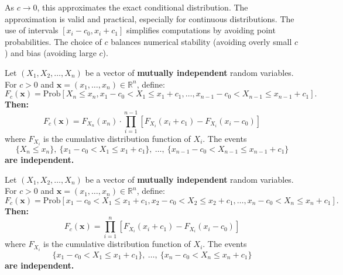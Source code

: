 As \(c \to 0\), this approximates the exact conditional distribution. The approximation is valid and practical, especially for continuous distributions. The use of intervals \([x_i - c_0, x_i + c_1]\) simplifies computations by avoiding point probabilities. The choice of \(c\) balances numerical stability (avoiding overly small \(c\)) and bias (avoiding large \(c\)).

\begin{theorem}
Let $(X_1, X_2, \dots, X_n)$ be a vector of \textbf{mutually independent} random variables. For $c > 0$ and $\mathbf{x} = (x_1, \dots, x_n) \in \mathbb{R}^n$, define:
\[
F_c(\mathbf{x}) = \mathrm{Prob}\left[ X_n \leq x_n,  x_1 - c_0 < X_1 \leq x_1 + c_1,  \dots,  x_{n-1} - c_0 < X_{n-1} \leq x_{n-1} + c_1 \right].
\]
\textbf{Then:}
\begin{equation}\label{eee91a}
\boxed{F_c(\mathbf{x}) = F_{X_n}(x_n) \cdot \prod_{i=1}^{n-1} \left[ F_{X_i}(x_i + c_1) - F_{X_i}(x_i - c_0) \right]}
\end{equation}
where $F_{X_i}$ is the cumulative distribution function of $X_i$. The events
\[
\{X_n \leq x_n\},\  \{x_1 - c_0 < X_1 \leq x_1 + c_1\},\  \dots,\  \{x_{n-1} - c_0 < X_{n-1} \leq x_{n-1} + c_1\}
\]
\textbf{are independent.}
\end{theorem}

\begin{theorem}
Let $(X_1, X_2, \dots, X_n)$ be a vector of \textbf{mutually independent} random variables. For $c > 0$ and $\mathbf{x} = (x_1, \dots, x_n) \in \mathbb{R}^n$, define:
\[
F_c(\mathbf{x}) = \mathrm{Prob}\left[ x_1 - c_0 < X_1 \leq x_1 + c_1,  x_2 - c_0 < X_2 \leq x_2 + c_1,  \dots,  x_n - c_0 < X_n \leq x_n + c_1 \right].
\]
\textbf{Then:}
\begin{equation}\label{eee91b}
\boxed{F_c(\mathbf{x}) = \prod_{i=1}^n \left[ F_{X_i}(x_i + c_1) - F_{X_i}(x_i - c_0) \right]}
\end{equation}
where $F_{X_i}$ is the cumulative distribution function of $X_i$. The events
\[
\{x_1 - c_0 < X_1 \leq x_1 + c_1\},\  \dots,\  \{x_n - c_0 < X_n \leq x_n + c_1\}
\]
\textbf{are independent.}
\end{theorem}

